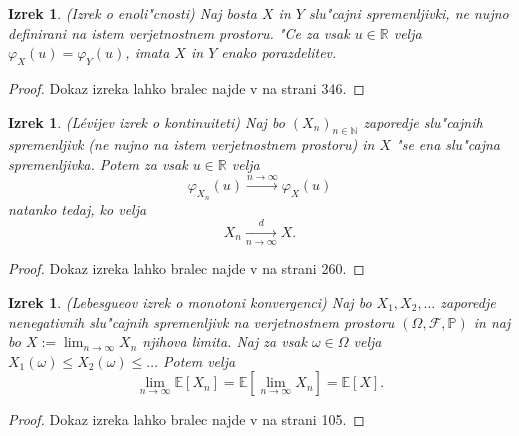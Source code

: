 \documentclass[12pt, a4paper, reqno]{amsart}
\theoremstyle{definition}
\theoremstyle{plain}
\newtheorem{izrek}[definicija]{Izrek}
\newcommand{\R}{\mathbb{R}}
\newcommand{\N}{\mathbb{N}}
\newcommand{\E}{\mathbb{E}}
\newcommand{\Prob}{\mathbb{P}}
\newcommand{\1}{\mathds{1}}
\begin{document}
    \begin{izrek}(Izrek o enoli"cnosti)
        Naj bosta $X$ in $Y$ slu"cajni spremenljivki, ne nujno definirani na istem verjetnostnem prostoru.
        "Ce za vsak $u\in\R$ velja $\varphi_X(u) = \varphi_Y(u)$, imata $X$ in $Y$ enako porazdelitev.
        \label{izr:enolicnost}
    \end{izrek}

    \begin{proof}
        Dokaz izreka lahko bralec najde v \cite{13} na strani 346.
    \end{proof}

    \begin{izrek}(Lévijev izrek o kontinuiteti)
        Naj bo $(X_n)_{n\in\N}$ zaporedje slu"cajnih spremenljivk (ne nujno na istem verjetnostnem prostoru)
        in $X$ "se ena slu"cajna spremenljivka. Potem za vsak $u\in\R$ velja
        \begin{equation*}
            \varphi_{X_n}(u) \xrightarrow{n\to\infty} \varphi_X(u) 
        \end{equation*}
        natanko tedaj, ko velja
        \begin{equation*}
            X_n \xrightarrow[n\to\infty]{d} X.
        \end{equation*}
        \label{izr:LevijevIzrek}
    \end{izrek}

    \begin{proof}
        Dokaz izreka lahko bralec najde v \cite{7} na strani 260.
    \end{proof}

    \begin{izrek}(Lebesgueov izrek o monotoni konvergenci)
        Naj bo $X_1, X_2, \dots $ zaporedje nenegativnih slu"cajnih spremenljivk na 
        verjetnostnem prostoru $(\Omega, \mathcal{F}, \Prob)$ in naj bo $X:= \lim_{n\to\infty}X_n$ 
        njihova limita. Naj za vsak $\omega \in \Omega$
        velja $X_1(\omega) \leq X_2(\omega) \leq \dots$ Potem velja 
        \begin{equation*}
            \lim_{n\to\infty}\E\left[X_n\right] = \E\left[\lim_{n\to\infty}X_n\right] = \E\left[X\right].
        \end{equation*}
        \label{izr:monotonaKonvergenca}
    \end{izrek}

    \begin{proof}
        Dokaz izreka lahko bralec najde v \cite{7} na strani 105.
    \end{proof}  
\end{document}
